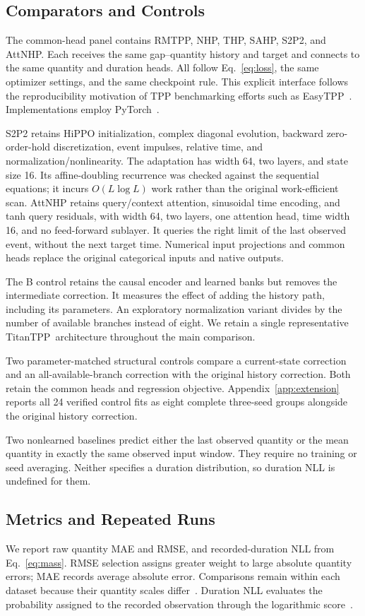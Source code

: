 \documentclass[runningheads]{llncs}
\newcommand{\method}{TitanTPP}
\begin{document}
\subsection{Comparators and Controls}
The common-head panel contains RMTPP, NHP, THP, SAHP, S2P2, and AttNHP.
Each receives the same gap--quantity history and target and connects to the
same quantity and duration heads. All follow Eq.~\eqref{eq:loss}, the same
optimizer settings, and the same checkpoint rule. This explicit interface
follows the reproducibility motivation of TPP benchmarking efforts such as
EasyTPP~\cite{xue2024easytpp}. Implementations employ
PyTorch~\cite{paszke2019pytorch}.

S2P2 retains HiPPO initialization, complex diagonal evolution, backward
zero-order-hold discretization, event impulses, relative time, and
normalization/nonlinearity. The adaptation has width 64, two layers, and
state size 16. Its affine-doubling recurrence was checked against the
sequential equations; it incurs $O(L\log L)$ work rather than the original
work-efficient scan. AttNHP retains query/context attention, sinusoidal time
encoding, and tanh query residuals, with width 64, two layers, one attention
head, time width 16, and no feed-forward sublayer. It queries the right limit
of the last observed event, without the next target time. Numerical input
projections and common heads replace the original categorical inputs and
native outputs.

The B control retains the causal encoder and learned banks but removes the
intermediate correction. It measures the effect of adding the history path,
including its parameters. An exploratory normalization variant divides by
the number of available branches instead of eight. We retain a single
representative \method\ architecture throughout the main comparison.

Two parameter-matched structural controls compare a current-state correction
and an all-available-branch correction with the original history correction.
Both retain the common heads and regression objective.
Appendix~\ref{app:extension} reports all 24 verified control fits as eight
complete three-seed groups alongside the original history correction.

Two nonlearned baselines predict either the last observed quantity or the
mean quantity in exactly the same observed input window. They require no
training or seed averaging. Neither specifies a duration distribution, so
duration NLL is undefined for them.

\subsection{Metrics and Repeated Runs}
We report raw quantity MAE and RMSE, and recorded-duration NLL from
Eq.~\eqref{eq:mass}. RMSE selection assigns greater weight to large absolute
quantity errors; MAE records average absolute error. Comparisons remain
within each dataset because their quantity scales differ~\cite{hyndman2006accuracy}.
Duration NLL evaluates the probability assigned to the recorded observation
through the logarithmic score~\cite{gneiting2007proper}.
\end{document}
